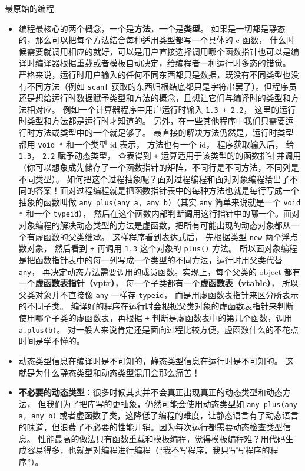 
\begin{issues}
\issueDraft
\end{issues}

最原始的编程
\begin{itemize}
\item 编程最核心的两个概念，一个是\textbf{方法}，一个是\textbf{类型}。 如果是一切都是静态的，那么可以把每个方法结合每种适用类型都写一个具体的 c 函数， 什么时候需要就调用相应的就好，可以是用户直接选择调用哪个函数指针也可以是编译时编译器根据重载或者模板自动决定，给编程者一种运行时多态的错觉。 严格来说，运行时用户输入的任何不同东西都只是数据，既没有不同类型也没有不同方法（例如 \verb`scanf` 获取的东西归根结底都只是字符串罢了）。但程序员还是想给运行时数据赋予类型和方法的概念，且想让它们与编译时的类型和方法相对应。 例如一个计算器程序中用户运行时输入 \verb`1.3 + 2.2`， 这里的运行时类型和方法都是运行时才知道的。 另外，在一些其他程序中我们只需要运行时方法或类型中的一个就足够了。 最直接的解决方法仍然是，运行时类型都用 \verb`void *` 和一个类型 id 表示， 方法也有一个 id， 程序获取输入后， 给 \verb`1.3`， \verb`2.2` 赋予动态类型， 查表得到 \verb`+` 运算适用于该类型的的函数指针并调用（你可以想象成先储存了一个函数指针的矩阵，不同行是不同方法，不同列是不同类型）。 如何把这个过程抽象呢？面对过程编程和面对对象编程给出了不同的答案！面对过程编程就是把函数指针表中的每种方法也就是每行写成一个抽象的函数叫做 \verb`any plus(any a, any b)`（其实 \verb`any` 简单来说就是一个 \verb`void *` 和一个 \verb`typeid`）， 然后在这个函数内部判断调用这行指针中的哪一个。面对对象编程的解决动态类型的方法是虚函数，把所有可能出现的动态对象都从一个有虚函数的父类继承。 这样程序看到表达式后， 先根据类型 \verb`new` 两个浮点数对象， 然后看到 \verb`+` 再调用 \verb`1.3` 这个对象的 \verb`plus()` 方法。 所以面对象编程是把函数指针表中的每一列写成一个类型的不同方法，运行时用父类代替 \verb`any`， 再决定动态方法需要调用的成员函数。实现上，每个父类的 object 都有一个\textbf{虚函数表指针（vptr）}， 每一个子类都有一个\textbf{虚函数表（vtable）}， 所以父类对象并不直接像 \verb`any` 一样存 \verb`typeid`， 而是用虚函数表指针来区分所表示的不同子类。 编译好的程序在运行时会根据父类对象的虚函数表指针来判断使用哪个子类的虚函数表，再根据 \verb`+` 判断是虚函数表中的第几个函数，调用 \verb`a.plus(b)`。 对一般人来说肯定还是面向过程比较方便，虚函数什么的不花点时间是学不懂的。
\item 动态类型信息在编译时是不可知的，静态类型信息在运行时是不可知的。 这就是为什么静态类型和动态类型混用会那么痛苦！
\item \textbf{不必要的动态类型}：很多时候其实并不会真正出现真正的动态类型和动态方法， 但我们为了把库写的更抽象，仍然可能会使用动态类型如 \verb`any plus(any a, any b)` 或者虚函数子类，这降低了编程的难度，让静态语言有了动态语言的味道，但浪费了不必要的性能开销。因为每次运行都需要动态检查类型信息。 性能最高的做法只有函数重载和模板编程，觉得模板编程难？用代码生成容易得多，也就是对编程进行编程（“我不写程序，我只写写程序的程序”）。

\end{itemize}
